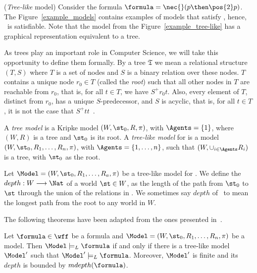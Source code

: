 \begin{example}%
    \label{ex2}
    (\emph{Tree-like} model) Consider the formula $\formula = \nec{} (p \then
    \pos{2} p)$. The Figure~\ref{example_models} contains examples of models
    that satisfy \formula, hence, \formula\ is satisfiable. Note that the model
    from the Figure~\ref{example_tree-like} has a graphical representation
    equivalent to a tree. 


 
    As trees play an important role in Computer Science, we will take this
    opportunity to define them formally. By a tree $\mathfrak{T}$ we mean a
    relational structure $(T, S)$ where $T$ is a set of nodes and $S$ is a
    binary relation over these nodes. $T$ contains a unique node $r_0 \in T$
    (called the \emph{root}) such that all other nodes in $T$ are reachable from
    $r_0$, that is, for all $t \in T$, we have $S^+r_0 t$.
    Also, every element of $T$, distinct from $r_0$, has a unique
    $S$-predecessor, and
    $S$ is acyclic, that is, for all $t \in T$, it is not the case that $S^+ t
    t$~\cite{areces2000tree}.

    A \emph{tree model} is a Kripke model $(W, \st_0, R, \pi)$, with $\Agents =
    \{1\}$, where $(W, R)$ is a tree and $\st_0$ is its root. A \emph{tree-like
    model} for  is a model $(W, \st_0, R_1, \ldots, R_n, \pi)$,
    with $\Agents = \{1, \ldots, n\}$, such that $(W, \cup_{i \in \Agents} R_i)$
    is a tree, with $\st_0$ as the root.

    Let $\Model = (W, \st_0, R_1, \ldots, R_a, \pi)$ be a tree-like model for
    . We define the $depth: W \longrightarrow \Nat$ of a world
    $\st \in W$, as the length of the path from $\st_0$ to $\st$ through the
    union of the relations in \Model. We sometimes say $depth$ of \Model~to mean
    the longest path from the root to any world in $W$.

    The following theorems have been adapted from the ones presented
    in~\cite{areces2000tree}.

    \begin{theorem}%
        \label{theo:tl1}
        Let $\formula \in \wff$ be a formula and $\Model = (W, \st_0, R_1,
        \ldots, R_n, \pi)$ be a model. Then $\Model \models_L \formula$ if and only if
        there is a tree-like model $\Model'$ such that $\Model' \models_L \formula$.
        Moreover, $\Model'$ is finite and its $depth$ is bounded by
        $mdepth(\formula)$.
    \end{theorem}


\end{example}
